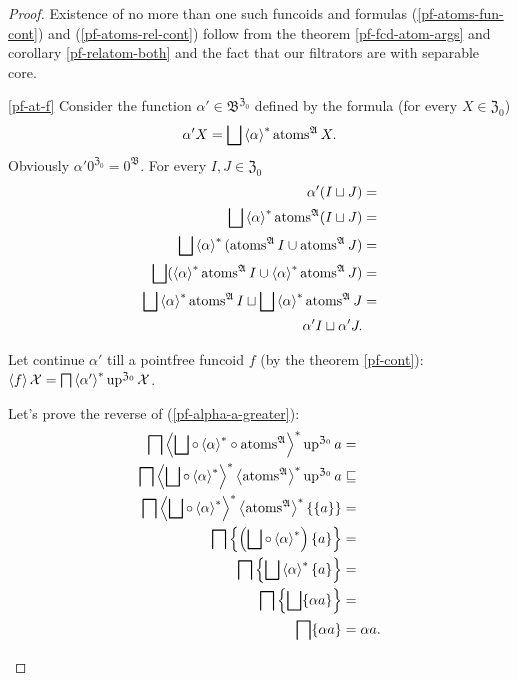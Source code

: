 \begin{proof}
Existence of no more than one such funcoids and formulas (\ref{pf-atoms-fun-cont})
and (\ref{pf-atoms-rel-cont}) follow from the theorem \ref{pf-fcd-atom-args}
and corollary \ref{pf-relatom-both} and the fact that our filtrators
are with separable core.
\begin{widedisorder}
\item [{\ref{pf-at-f}}] Consider the function $\alpha'\in\mathfrak{B}^{\mathfrak{Z}_{0}}$
defined by the formula (for every $X\in\mathfrak{Z}_{0}$) 
\[
\alpha'X=\bigsqcup\left\langle \alpha\right\rangle ^{\ast}\operatorname{atoms}^{\mathfrak{A}}X.
\]
Obviously $\alpha'0^{\mathfrak{Z}_{0}}=0^{\mathfrak{B}}$. For every
$I,J\in\mathfrak{Z}_{0}$
\begin{align*}
\alpha'(I\sqcup J) & =\\
\bigsqcup\left\langle \alpha\right\rangle ^{\ast}\operatorname{atoms}^{\mathfrak{A}}(I\sqcup J) & =\\
\bigsqcup\left\langle \alpha\right\rangle ^{\ast}(\operatorname{atoms}^{\mathfrak{A}}I\cup\operatorname{atoms}^{\mathfrak{A}}J) & =\\
\bigsqcup(\left\langle \alpha\right\rangle ^{\ast}\operatorname{atoms}^{\mathfrak{A}}I\cup\left\langle \alpha\right\rangle ^{\ast}\operatorname{atoms}^{\mathfrak{A}}J) & =\\
\bigsqcup\left\langle \alpha\right\rangle ^{\ast}\operatorname{atoms}^{\mathfrak{A}}I\sqcup\bigsqcup\left\langle \alpha\right\rangle ^{\ast}\operatorname{atoms}^{\mathfrak{A}}J & =\\
\alpha'I\sqcup\alpha'J.
\end{align*}



Let continue $\alpha'$ till a pointfree funcoid $f$ (by the theorem
\ref{pf-cont}): $\left\langle f\right\rangle\mathcal{X}=\bigsqcap\left\langle \alpha'\right\rangle ^{\ast}\operatorname{up}^{\mathfrak{Z}_{0}}\mathcal{X}$.


Let's prove the reverse of (\ref{pf-alpha-a-greater}):
\begin{align*}
\bigsqcap\left\langle \bigsqcup\circ\left\langle \alpha\right\rangle ^{\ast}\circ\operatorname{atoms}^{\mathfrak{A}}\right\rangle ^{\ast}\operatorname{up}^{\mathfrak{Z}_{0}}a & =\\
\bigsqcap\left\langle \bigsqcup\circ\left\langle \alpha\right\rangle ^{\ast}\right\rangle ^{\ast}\left\langle \operatorname{atoms}^{\mathfrak{A}}\right\rangle ^{\ast}\operatorname{up}^{\mathfrak{Z}_{0}}a & \sqsubseteq\\
\bigsqcap\left\langle \bigsqcup\circ\left\langle \alpha\right\rangle ^{\ast}\right\rangle ^{\ast}\left\langle \operatorname{atoms}^{\mathfrak{A}}\right\rangle ^{\ast}\{\{a\}\} & =\\
\bigsqcap\left\{ \left(\bigsqcup\circ\left\langle \alpha\right\rangle ^{\ast}\right)\{a\}\right\}  & =\\
\bigsqcap\left\{ \bigsqcup\left\langle \alpha\right\rangle ^{\ast}\{a\}\right\}  & =\\
\bigsqcap\left\{ \bigsqcup\{\alpha a\}\right\}  & =\\
\bigsqcap\{\alpha a\} & =\alpha a.
\end{align*}




\end{widedisorder}
\end{proof}
